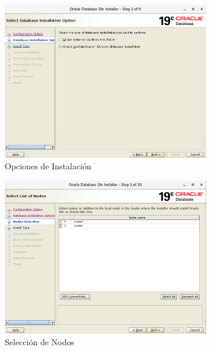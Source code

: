 \documentclass{article}
\begin{document}
\begin{figure}[H]
		\begin{center}
			\includegraphics[width=0.80\textwidth]{db_install_2_installation_options.png}
		\end{center}
		\caption{Opciones de Instalación}
\end{figure}

\begin{figure}[H]
		\begin{center}
			\includegraphics[width=0.80\textwidth]{db_install_3_nodes_selection.png}
		\end{center}
		\caption{Selección de Nodos}
\end{figure}
\end{document}
